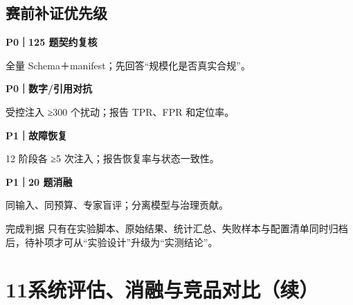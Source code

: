 \documentclass[10pt,a4paper,UTF8]{ctexart}
\begin{document}
\subsection*{赛前补证优先级}
\begin{minipage}[t]{0.24\textwidth}\begin{flatbox}\textbf{P0｜125 题契约复核}\par 全量 Schema＋manifest；先回答“规模化是否真实合规”。\end{flatbox}\end{minipage}\hfill
\begin{minipage}[t]{0.24\textwidth}\begin{flatbox}\textbf{P0｜数字/引用对抗}\par 受控注入 ≥300 个扰动；报告 TPR、FPR 和定位率。\end{flatbox}\end{minipage}\hfill
\begin{minipage}[t]{0.24\textwidth}\begin{flatbox}\textbf{P1｜故障恢复}\par 12 阶段各 ≥5 次注入；报告恢复率与状态一致性。\end{flatbox}\end{minipage}\hfill
\begin{minipage}[t]{0.24\textwidth}\begin{flatbox}\textbf{P1｜20 题消融}\par 同输入、同预算、专家盲评；分离模型与治理贡献。\end{flatbox}\end{minipage}

\begin{innovationbox}{完成判据}
只有在实验脚本、原始结果、统计汇总、失败样本与配置清单同时归档后，待补项才可从“实验设计”升级为“实测结论”。
\end{innovationbox}
\clearpage

\section*{11\quad 系统评估、消融与竞品对比（续）}
\end{document}
